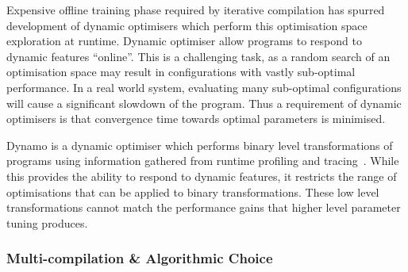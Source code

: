 Expensive offline training phase required by iterative compilation has spurred development of dynamic optimisers which perform this optimisation space exploration at runtime. Dynamic optimiser allow programs to respond to dynamic features ``online''. This is a challenging task, as a random search of an optimisation space may result in configurations with vastly sub-optimal performance. In a real world system, evaluating many sub-optimal configurations will cause a significant slowdown of the program. Thus a requirement of dynamic optimisers is that convergence time towards optimal parameters is minimised.


 Dynamo is a dynamic optimiser which performs binary level transformations of programs using information gathered from runtime profiling and tracing~\cite{Bala2000}. While this provides the ability to respond to dynamic features, it restricts the range of optimisations that can be applied to binary transformations. These low level transformations cannot match the performance gains that higher level parameter tuning produces.




\subsubsection{Multi-compilation \& Algorithmic Choice}

